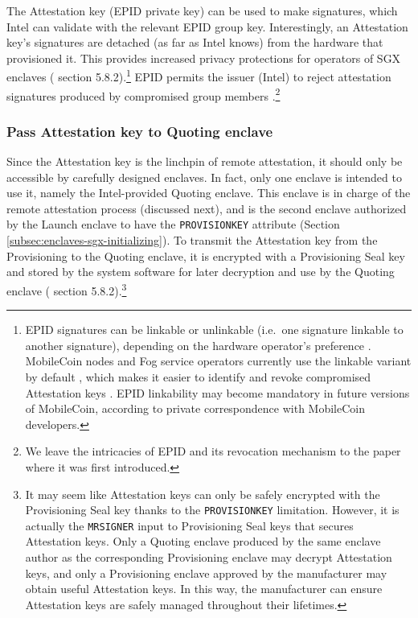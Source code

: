 The Attestation key (EPID private key) can be used to make signatures, which Intel can validate with the relevant EPID group key. Interestingly, an Attestation key's signatures are detached (as far as Intel knows) from the hardware that provisioned it. This provides increased privacy protections for operators of SGX enclaves (\cite{intel-sgx-explained-advanced} section 5.8.2).\footnote{EPID signatures can be linkable or unlinkable (i.e.\ one signature linkable to another signature), depending on the hardware operator's preference \cite{sgx-epid-provisioning-attestation, kudelski-sgx-secure-enclaves-review}. MobileCoin nodes and Fog service operators currently use the linkable variant by default \cite{mobilecoin-consensus-service-readme}, which makes it easier to identify and revoke compromised Attestation keys \cite{sgx-epid-provisioning-attestation}. EPID linkability may become mandatory in future versions of MobileCoin, according to private correspondence with MobileCoin developers.} EPID permits the issuer (Intel) to reject attestation signatures produced by compromised group members \cite{epid-paper, sgx-epid-provisioning-attestation}.\footnote{We leave the intricacies of EPID and its revocation mechanism to the paper \cite{epid-paper} where it was first introduced.}

\subsubsection{Pass Attestation key to Quoting enclave}

Since the Attestation key is the linchpin of remote attestation, it should only be accessible by carefully designed enclaves. In fact, only one enclave is intended to use it, namely the Intel-provided Quoting enclave. This enclave is in charge of the remote attestation process (discussed next), and is the second enclave authorized by the Launch enclave to have the {\tt PROVISIONKEY} attribute (Section \ref{subsec:enclaves-sgx-initializing}). To transmit the Attestation key from the Provisioning to the Quoting enclave, it is encrypted with a Provisioning Seal key and stored by the system software for later decryption and use by the Quoting enclave (\cite{intel-sgx-explained-advanced} section 5.8.2).\footnote{It may seem like Attestation keys can only be safely encrypted with the Provisioning Seal key thanks to the {\tt PROVISIONKEY} limitation. However, it is actually the {\tt MRSIGNER} input to Provisioning Seal keys that secures Attestation keys. Only a Quoting enclave produced by the same enclave author as the corresponding Provisioning enclave may decrypt Attestation keys, and only a Provisioning enclave approved by the manufacturer may obtain useful Attestation keys. In this way, the manufacturer can ensure Attestation keys are safely managed throughout their lifetimes.}


